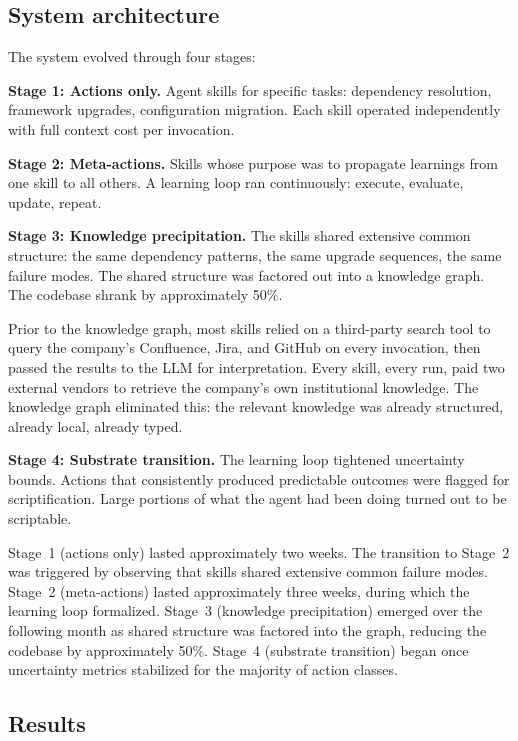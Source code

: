 \documentclass[11pt]{article}
\theoremstyle{definition}
\begin{document}
\subsection{System architecture}

The system evolved through four stages:

\textbf{Stage 1: Actions only.} Agent skills for specific tasks:
dependency resolution, framework upgrades, configuration migration.
Each skill operated independently with full context cost per invocation.

\textbf{Stage 2: Meta-actions.} Skills whose purpose was to propagate
learnings from one skill to all others. A learning loop ran
continuously: execute, evaluate, update, repeat.

\textbf{Stage 3: Knowledge precipitation.} The skills shared extensive
common structure: the same dependency patterns, the same upgrade
sequences, the same failure modes. The shared structure was factored
out into a knowledge graph. The codebase shrank by approximately 50\%.

Prior to the knowledge graph, most skills relied on a third-party
search tool to query the company's Confluence, Jira, and GitHub on
every invocation, then passed the results to the LLM for
interpretation. Every skill, every run, paid two external vendors to
retrieve the company's own institutional knowledge. The knowledge graph
eliminated this: the relevant knowledge was already structured,
already local, already typed.

\textbf{Stage 4: Substrate transition.} The learning loop tightened
uncertainty bounds. Actions that consistently produced predictable
outcomes were flagged for scriptification. Large portions of what the
agent had been doing turned out to be scriptable.

Stage~1 (actions only) lasted approximately two weeks. The transition
to Stage~2 was triggered by observing that skills shared extensive
common failure modes. Stage~2 (meta-actions) lasted approximately
three weeks, during which the learning loop formalized. Stage~3
(knowledge precipitation) emerged over the following month as shared
structure was factored into the graph, reducing the codebase by
approximately 50\%. Stage~4 (substrate transition) began once
uncertainty metrics stabilized for the majority of action classes.

\subsection{Results}
\end{document}
